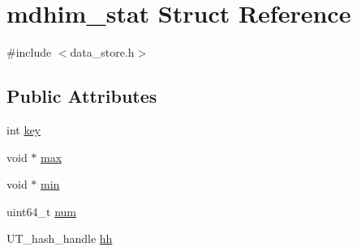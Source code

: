 \hypertarget{structmdhim__stat}{\section{mdhim\-\_\-stat Struct Reference}
\label{d1/d0b/structmdhim__stat}
}


{\ttfamily \#include $<$data\-\_\-store.\-h$>$}

\subsection*{Public Attributes}
\begin{DoxyCompactItemize}
\item 
int \hyperlink{structmdhim__stat_a8257aee706371a50726235fcb5d1cb6c}{key}
\item 
void $\ast$ \hyperlink{structmdhim__stat_ae563344828e5e734dc924d6192f5fde4}{max}
\item 
void $\ast$ \hyperlink{structmdhim__stat_a66250dbd1b7be13842e4679ca46513b0}{min}
\item 
uint64\-\_\-t \hyperlink{structmdhim__stat_a0630c9382b160becabc1eef79cedb95c}{num}
\item 
U\-T\-\_\-hash\-\_\-handle \hyperlink{structmdhim__stat_a7efece810db77a787513ba5577800d7a}{hh}
\end{DoxyCompactItemize}


